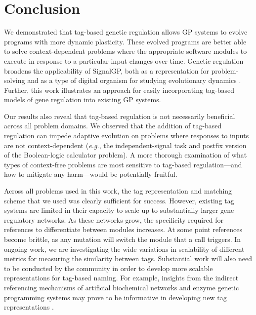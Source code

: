 \section{Conclusion}

We demonstrated that tag-based genetic regulation allows GP systems to evolve programs with more dynamic plasticity.
These evolved programs are better able to solve context-dependent problems where the appropriate software modules to execute in response to a particular input changes over time.
Genetic regulation broadens the applicability of SignalGP, both as a representation for problem-solving and as a type of digital organism for studying evolutionary dynamics \citep{Lalejini_Moreno_Ofria_DISHTINY_2020}.
Further, this work illustrates an approach for easily incorporating tag-based models of gene regulation into existing GP systems. 

Our results also reveal that tag-based regulation is not necessarily beneficial across all problem domains.
We observed that the addition of tag-based regulation can impede adaptive evolution on problems where responses to inputs are not context-dependent (\textit{e.g.}, the independent-signal task and postfix version of the Boolean-logic calculator problem). 
A more thorough examination of what types of context-free problems are most sensitive to tag-based regulation---and how to mitigate any harm---would be potentially fruitful.

Across all problems used in this work, the tag representation and matching scheme that we used was clearly sufficient for success. 
However, existing tag systems are limited in their capacity to scale up to substantially larger gene regulatory networks. 
As these networks grow, the specificity required for references to differentiate between modules increases. 
At some point references become brittle, as any mutation will switch the module that a call triggers.
In ongoing work, we are investigating the wide variations in scalability of different metrics for measuring the similarity between tags.
Substantial work will also need to be conducted by the community in order to develop more scalable representations for tag-based naming.
For example, insights from the indirect referencing mechanisms of artificial biochemical networks and enzyme genetic programming systems may prove to be informative in developing new tag representations \citep{lones_modelling_2004,lones_artificial_2014,lones_biochemical_2013}.


